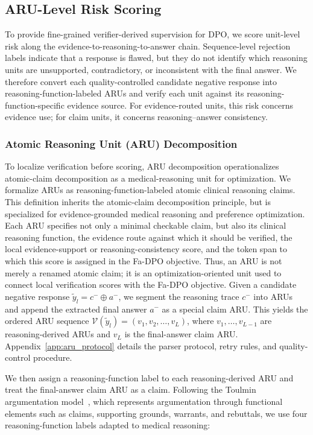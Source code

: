 \documentclass[a4paper,fleqn,doubleblind]{cas-sc}
\begin{document}
\subsection{ARU-Level Risk Scoring}
\label{sec:graph}
To provide fine-grained verifier-derived supervision for DPO, we score unit-level risk along the evidence-to-reasoning-to-answer chain. Sequence-level rejection labels indicate that a response is flawed, but they do not identify which reasoning units are unsupported, contradictory, or inconsistent with the final answer. We therefore convert each quality-controlled candidate negative response into reasoning-function-labeled ARUs and verify each unit against its reasoning-function-specific evidence source. For evidence-routed units, this risk concerns evidence use; for claim units, it concerns reasoning--answer consistency.

\subsubsection{Atomic Reasoning Unit (ARU) Decomposition}
\label{sec:decomposition}
To localize verification before scoring, ARU decomposition operationalizes atomic-claim decomposition as a medical-reasoning unit for optimization. We formalize ARUs as reasoning-function-labeled atomic clinical reasoning claims. This definition inherits the atomic-claim decomposition principle, but is specialized for evidence-grounded medical reasoning and preference optimization. Each ARU specifies not only a minimal checkable claim, but also its clinical reasoning function, the evidence route against which it should be verified, the local evidence-support or reasoning-consistency score, and the token span to which this score is assigned in the Fa-DPO objective. Thus, an ARU is not merely a renamed atomic claim; it is an optimization-oriented unit used to connect local verification scores with the Fa-DPO objective. Given a candidate negative response $\tilde{y}_l = c^{-} \oplus a^{-}$, we segment the reasoning trace $c^{-}$ into ARUs and append the extracted final answer $a^{-}$ as a special claim ARU. This yields the ordered ARU sequence $\mathcal{V}(\tilde{y}_l) = (v_1, v_2, \dots, v_L)$, where $v_1, \dots, v_{L-1}$ are reasoning-derived ARUs and $v_L$ is the final-answer claim ARU. Appendix~\ref{app:aru_protocol} details the parser protocol, retry rules, and quality-control procedure.

We then assign a reasoning-function label to each reasoning-derived ARU and treat the final-answer claim ARU as a claim. Following the Toulmin argumentation model~\cite{toulmin1958uses}, which represents argumentation through functional elements such as claims, supporting grounds, warrants, and rebuttals, we use four reasoning-function labels adapted to medical reasoning:
\end{document}

